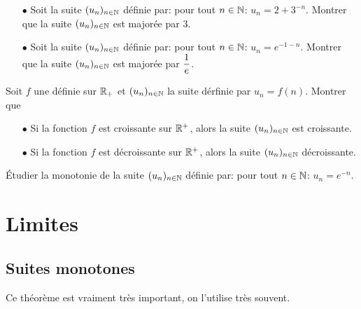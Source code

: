 \documentclass[a4paper, 11pt]{article}
\begin{document}


{\footnotesize 
\begin{exercice}
\begin{itemize}
\item[$\bullet$] Soit la suite $(u_n)_{n\in \mathbb{N}}$ d\'efinie par: pour tout $n\in\mathbb{N}$: $u_n=2+3^{-n}$. Montrer que la suite $(u_n)_{n\in \mathbb{N}}$ est major\'ee par $3$.
\item[$\bullet$] Soit la suite $(u_n)_{n\in \mathbb{N}}$ d\'efinie par: pour tout $n\in\mathbb{N}$: $u_n=e^{-1-n}$. Montrer que la suite $(u_n)_{n\in \mathbb{N}}$ est major\'ee par $\displaystyle\frac{1}{e}$.
\end{itemize}
\end{exercice}}
\vspace{0.3cm}



\begin{exercice}
Soit $f$ une définie sur $\mathbb{R}_+$ et $(u_n)_{n\in \mathbb{N}}$ la suite dérfinie par $u_n=f(n)$. Montrer que 
\begin{itemize}
\item[$\bullet$] Si la fonction $f$ est croissante sur $\mathbb{R}^+$, alors la suite $(u_n)_{n\in \mathbb{N}}$ est croissante.
\item[$\bullet$] Si la fonction $f$ est d\'ecroissante sur $\mathbb{R}^+$, alors la suite $(u_n)_{n\in \mathbb{N}}$ décroissante.
\end{itemize}
\end{exercice}





{\footnotesize 
\begin{exercice}
\'Etudier la monotonie de la suite $(u_n)_{n\in \mathbb{N}}$ d\'efinie par: pour tout $n\in\mathbb{N}$: $u_n=e^{-n}$.
\end{exercice}}
\section{Limites}

\subsection{Suites monotones}
Ce th\'eor\`eme est  vraiment tr\`{e}s important, on l'utilise tr\`{e}s souvent.
\end{document}
